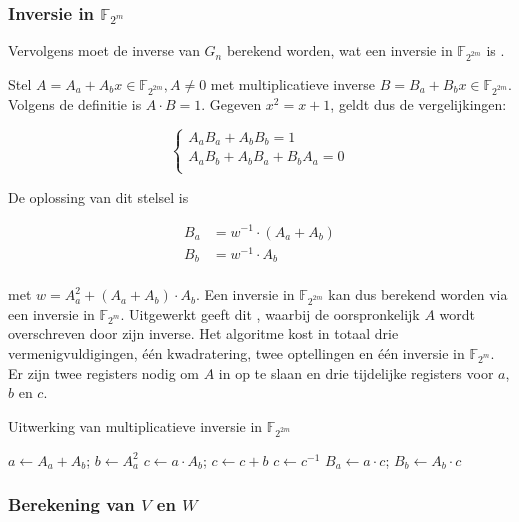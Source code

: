\subsubsection{Inversie in $\mathbb{F}_{2^m}$}

Vervolgens moet de inverse van $G_n$ berekend worden, wat een inversie in $\mathbb{F}_{2^{2m}}$ is \cite{beuchat}.

Stel $A = A_a + A_b x \in \mathbb{F}_{2^{2m}}, A \neq 0$ met multiplicatieve inverse $B = B_a + B_b x \in \mathbb{F}_{2^{2m}}$. Volgens de definitie is $A \cdot B = 1$. Gegeven $x^2 = x + 1$, geldt dus de vergelijkingen:

\[\left\{\begin{array}{l}
A_a B_a + A_b B_b = 1\\
A_a B_b + A_b B_a + B_b A_a = 0\\
\end{array}\right.\]

De oplossing van dit stelsel is

\[\begin{aligned}
B_a	&= w^{-1} \cdot (A_a + A_b)\\
B_b	&= w^{-1} \cdot A_b\\
\end{aligned}\]

met $w = A_a^2 + (A_a + A_b) \cdot A_b$. Een inversie in $\mathbb{F}_{2^{2m}}$ kan dus berekend worden via een inversie in $\mathbb{F}_{2^m}$. Uitgewerkt geeft dit , waarbij de oorspronkelijk $A$ wordt overschreven door zijn inverse. Het algoritme kost in totaal drie vermenigvuldigingen, \'e\'en kwadratering, twee optellingen en \'e\'en inversie in $\mathbb{F}_{2^m}$. Er zijn twee registers nodig om $A$ in op te slaan en drie tijdelijke registers voor $a$, $b$ en $c$.

\begin{algorithm}[h]
	\caption{Uitwerking van multiplicatieve inversie in $\mathbb{F}_{2^{2m}}$}
	\label{algoritme-implementatie-miller-f2m-inverse}
	$a \leftarrow A_a + A_b$; $b \leftarrow A_a^2$\;
	$c \leftarrow a \cdot A_b$; $c \leftarrow c + b$\;
	$c \leftarrow c^{-1}$\;
	$B_a \leftarrow a \cdot c$; $B_b \leftarrow A_b \cdot c$\;
\end{algorithm}

\subsubsection{Berekening van $V$ en $W$}

